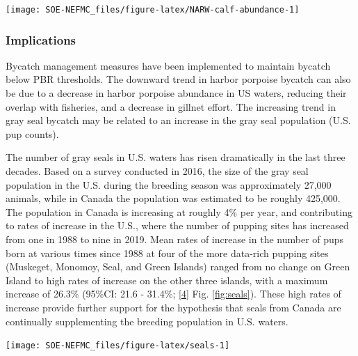 \documentclass[
  10pt,
]{article}
\let\origfigure\figure
\let\endorigfigure\endfigure
\renewenvironment{figure}[1][2] {
    \expandafter\origfigure\expandafter[H]
} {
    \endorigfigure
}
\begin{document}
\begin{figure}

{\centering \texttt{[image: SOE-NEFMC\_files/figure-latex/NARW-calf-abundance-1]} 

}

\caption{Number of North Atlantic right whale calf births, 1990 - 2021.}\label{fig:NARW-calf-abundance}
\end{figure}

\hypertarget{implications-5}{%
\subsubsection{Implications}\label{implications-5}}

Bycatch management measures have been implemented to maintain bycatch below PBR thresholds. The downward trend in harbor porpoise bycatch can also be due to a decrease in harbor porpoise abundance in US waters, reducing their overlap with fisheries, and a decrease in gillnet effort. The increasing trend in gray seal bycatch may be related to an increase in the gray seal population (U.S. pup counts).

The number of gray seals in U.S. waters has risen dramatically in the last three decades. Based on a survey conducted in 2016, the size of the gray seal population in the U.S. during the breeding season was approximately 27,000 animals, while in Canada the population was estimated to be roughly 425,000. The population in Canada is increasing at roughly 4\% per year, and contributing to rates of increase in the U.S., where the number of pupping sites has increased from one in 1988 to nine in 2019. Mean rates of increase in the number of pups born at various times since 1988 at four of the more data-rich pupping sites (Muskeget, Monomoy, Seal, and Green Islands) ranged from no change on Green Island to high rates of increase on the other three islands, with a maximum increase of 26.3\% (95\%CI: 21.6 - 31.4\%; {[}\protect\hyperlink{ref-wood_rates_2020}{4}{]} Fig. \ref{fig:seals}). These high rates of increase provide further support for the hypothesis that seals from Canada are continually supplementing the breeding population in U.S. waters.

\begin{figure}

{\centering \texttt{[image: SOE-NEFMC\_files/figure-latex/seals-1]} 

}

\caption{Estimated mean rates of increase (solid line) and CIs (shaded area) in number of gray seal pups born at four United States pupping colonies at various times from 1988 to 2019. From Wood et al. 2020}\label{fig:seals}
\end{figure}
\end{document}

